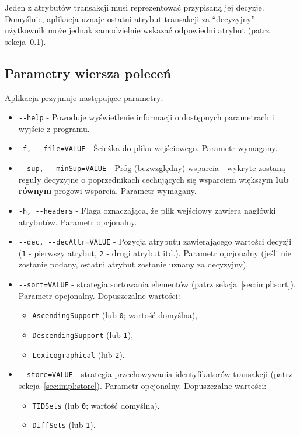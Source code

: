 \documentclass[a4paper,10pt]{article}
\begin{document}
 Jeden z atrybutów transakcji musi reprezentować przypisaną jej decyzję.
 Domyślnie, aplikacja uznaje ostatni atrybut transakcji za ``decyzyjny'' - użytkownik może jednak samodzielnie wskazać odpowiedni atrybut (patrz sekcja~\ref{sec:input:cmd}).
 
 
 \subsection{Parametry wiersza poleceń} \label{sec:input:cmd}
 Aplikacja przyjmuje następujące parametry:
 
 \begin{itemize}
  \item \verb+--help+ - Powoduje wyświetlenie informacji o dostępnych parametrach i wyjście z programu.
  \item \verb+-f, --file=VALUE+ - Ścieżka do pliku wejściowego. Parametr wymagany.
  \item \verb+--sup, --minSup=VALUE+ - Próg (bezwzględny) wsparcia - wykryte zostaną reguły decyzyjne o poprzednikach cechujących się wsparciem większym \textbf{lub równym} progowi wsparcia. Parametr wymagany.
  \item \verb+-h, --headers+ - Flaga oznaczająca, że plik wejściowy zawiera nagłówki atrybutów. Parametr opcjonalny.
  \item \verb+--dec, --decAttr=VALUE+ - Pozycja atrybutu zawierającego wartości decyzji (\verb+1+ - pierwszy atrybut, \verb+2+ - drugi atrybut itd.). Parametr opcjonalny (jeśli nie zostanie podany, ostatni atrybut zostanie uznany za decyzyjny).
  \item \verb+--sort=VALUE+ - strategia sortowania elementów (patrz sekcja~\ref{sec:impl:sort}). Parametr opcjonalny.
  Dopuszczalne wartości:
  \begin{itemize}
   \item \verb+AscendingSupport+ (lub \verb+0+; wartość domyślna),
   \item \verb+DescendingSupport+ (lub \verb+1+),
   \item \verb+Lexicographical+ (lub \verb+2+).
  \end{itemize}
 
  \item \verb+--store=VALUE+ - strategia przechowywania identyfikatorów transakcji (patrz sekcja~\ref{sec:impl:store}). Parametr opcjonalny.
  Dopuszczalne wartości:
  \begin{itemize}
   \item \verb+TIDSets+ (lub \verb+0+; wartość domyślna),
   \item \verb+DiffSets+ (lub \verb+1+).
  \end{itemize}
  

\end{itemize}
\end{document}
